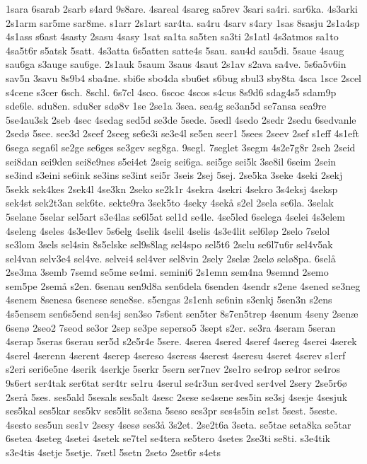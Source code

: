 {1sara
6sarab
2sarb
s4ard
9s8are.
4sareal
4sareg
sa5rev
3sari
sa4ri.
sar6ka.
4s3arki
2s1arm
sar5me
sar8me.
s1arr
2s1art
sar4ta.
sa4ru
4sarv
s4ary
1sas
8sasju
2s1a4sp
4s1ass
s6ast
4sasty
2sasu
4sasy
1sat
sa1ta
sa5ten
sa3ti
2s1atl
4s3atmos
sa1to
4sa5t6r
s5atsk
5satt.
4s3atta
6s5atten
satte4s
5sau.
sau4d
sau5di.
5saue
4saug
sau6ga
s3auge
sau6ge.
2s1auk
5saum
3saus
4saut
2s1av
s2ava
sa4ve.
5s6a5v6in
sav5n
3savu
8s9b4
sba4ne.
sbi6e
sbo4da
sbu6et
s6bug
sbul3
sby8ta
4sca
1sce
2scel
s4cene
s3cer
6sch.
8schl.
6s7cl
4sco.
6scoc
4scos
s4cus
8s9d6
sdag4s5
sdam9p
sde6le.
sdu8en.
sdu8er
sdø8v
1se
2se1a
3sea.
sea4g
se3an5d 
se7ansa
sea9re
5se4au3sk
2seb
4sec
4sedag
sed5d
se3de
5sede.
5sedl
4sedo
2sedr
2sedu
6sedvanle
2sedø
5see.
see3d
2seef
2seeg
se6e3i
se3e4l
se5en
seer1
5sees
2seev
2sef
s1eff
4s1eft
6sega
sega6l
se2ge
se6ges
se3gev
seg8ga.
9segl.
7seglet
3segm
4s2e7g8r
2seh
2seid
sei8dan
sei9den
sei8e9nes
s5ei4et
2seig
sei6ga.
sei5ge
sei5k
3se8il
6seim
2sein
se3ind
s3eini
se6ink
se3ins
se3int
sei5r
3seis
2sej
5sej.
2se5ka
3seke
4seki
2sekj
5sekk
sek4kes
2sek4l
4se3kn
2seko
se2k1r
4sekra
4sekri
4sekro
3s4eksj
4seksp
sek4st
sek2t3an
sek6te.
sekte9ra
3sek5to
4seky
4sekå
s2el
2sela
se6la.
3selak
5selane
5selar
sel5art
s3e4las
se6l5at
sel1d
se4le.
4se5led
6selega
4selei
4s3elem
4seleng
4seles
4s3e4lev
5s6elg
4selik
4selil
4selis
4s3e4lit
sel6løp
2selo
7selol
se3lom
3sels
sel4sin
8s5elske
sel9s8lag
sel4spo
sel5t6
2selu
se6l7u6r
sel4v5ak
sel4van
selv3e4
sel4ve.
selvei4
sel4ver
sel8vin
2sely
2selæ
2selø
selø8pa.
6selå
2se3ma
3semb
7semd
se5me
se4mi.
semini6
2s1emn
sem4na
9semnd
2semo
sem5pe
2semå
s2en.
6senau
sen9d8a
sen6dela
6senden
4sendr
s2ene
4sened
se3neg
4senem
8senesa
6senese
sene8se.
s5engas
2s1enh
se6nin
s3enkj
5sen3n
s2ens
4s5ensem
sen6s5end
sen4sj
sen3so
7s6ent
sen5ter
8s7en5trep
4senum
4seny
2senæ
6senø
2seo2
7seod
se3or
2sep
se3pe
seperso5
3sept
s2er.
se3ra
4seram
5seran
4serap
5seras
6serau
ser5d
s2e5r4e
5sere.
4serea
4sered
4seref
4sereg
4serei
4serek
4serel
4serenn
4serent
4serep
4sereso
4seress
4serest
4seresu
4seret
4serev
s1erf
s2eri
seri6e5ne
4serik
4serkje
5serkr
5sern
ser7nev
2se1ro
se4rop
se4ror
se4ros
9s6ert
ser4tak
ser6tat
ser4tr
se1ru
4serul
se4r3un
ser4ved
ser4vel
2sery
2se5r6ø
2serå
5ses.
ses5ald
5sesals
ses5alt
4sesc
2sese
se4sene
ses5in
se3sj
4sesje
4sesjuk
ses5kal
ses5kar
ses5kv
ses5lit
se3sna
5seso
ses3pr
ses4s5in
se1st
5sest.
5seste.
4sesto
ses5un
ses1v
2sesy
4sesø
ses3å
3s2et.
2se2t6a
3seta.
se5tae
seta8ka
se5tar
6setea
4seteg
4setei
4setek
se7tel
se4tera
se5tero
4setes
2se3ti
se8ti.
s3e4tik
s3e4tis
4setje
5setje.
7setl
5setn
2seto
2set6r
s4ets
}
